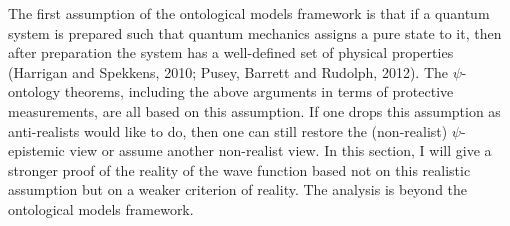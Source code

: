 The first assumption of the ontological models framework is that if a quantum system is prepared such that quantum mechanics assigns a pure state to it, then after preparation the system has a well-defined set of physical properties (Harrigan and Spekkens, 2010; Pusey, Barrett and Rudolph, 2012). The $\psi$-ontology theorems, including the above arguments in terms of protective measurements, are all based on this assumption. If one drops this assumption as anti-realists would like to do, then one can still restore the (non-realist) $\psi$-epistemic view or assume another non-realist view. In this section, I will give a stronger proof of the reality of the wave function based not on this realistic assumption but on a weaker criterion of reality. The analysis is beyond the ontological models framework.

